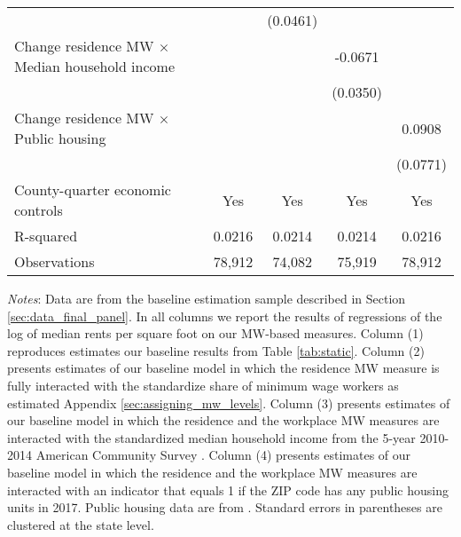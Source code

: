 \begin{table}[hbt!]
\begin{tabular}{@{}lcccc@{}}
                                                                &        & (0.0461) &        &        \\
        Change residence MW $\times$ Median household income    &        &       &  -0.0671   &        \\
                                                                &        &       & (0.0350)  &        \\
        Change residence MW $\times$ Public housing             &        &       &        &  0.0908   \\
                                                                &        &       &        & (0.0771)  \\
        County-quarter economic controls                        &  Yes   &  Yes  &   Yes  &  Yes   \\
        R-squared                                               &  0.0216   &  0.0214  &   0.0214  &  0.0216   \\
        Observations                                            &  78,912  &  74,082 &   75,919 &  78,912  \\ \bottomrule
    \end{tabular}

    \begin{minipage}{.95\textwidth} \footnotesize
        \vspace{2mm}
        \textit{Notes}: 
        Data are from the baseline estimation sample described in Section 
        \ref{sec:data_final_panel}.
        In all columns we report the results of regressions of the log of median rents 
        per square foot on our MW-based measures.
        Column (1) reproduces estimates our baseline results from Table \ref{tab:static}.
        Column (2) presents estimates of our baseline model in which the residence MW 
        measure is fully interacted with the standardize share of minimum wage workers as 
        estimated Appendix \ref{sec:assigning_mw_levels}.
        Column (3) presents estimates of our baseline model in which the residence and 
        the workplace MW measures are interacted with the standardized median household income 
        from the 5-year 2010-2014 American Community Survey \parencite[ACS;][]{CensusACS}.
        Column (4) presents estimates of our baseline model in which the residence and 
        the workplace MW measures are interacted with an indicator that equals 1 if 
        the ZIP code has any public housing units in 2017. Public housing data are from \textcite{hudHousing}.
        Standard errors in parentheses are clustered at the state level.
    \end{minipage}
\end{table}
